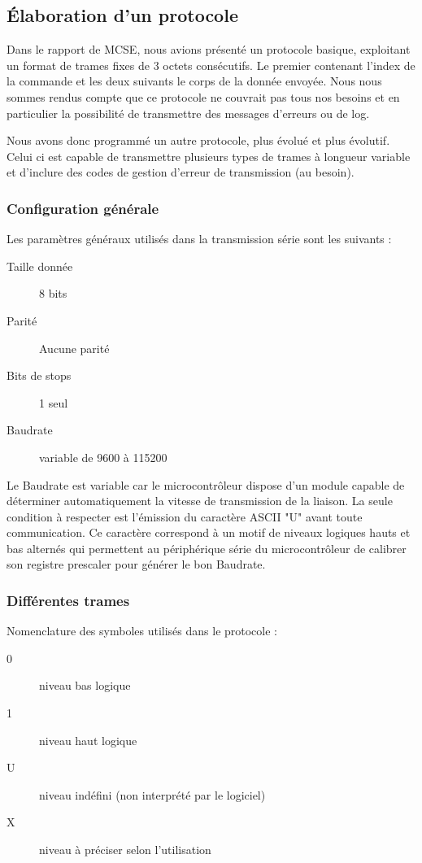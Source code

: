 \documentclass[11pt, french]{article} %
\begin{document}
\subsection{Élaboration d'un protocole}
Dans le rapport de MCSE, nous avions présenté un protocole basique, exploitant un format de trames fixes de 3 octets consécutifs. Le premier contenant l'index de la commande et les deux suivants le corps de la donnée envoyée. Nous nous sommes rendus compte que ce protocole ne couvrait pas tous nos besoins et en particulier la possibilité de transmettre des messages d'erreurs ou de log.

\medskip
Nous avons donc programmé un autre protocole, plus évolué et plus évolutif. Celui ci est capable de transmettre plusieurs types de trames à longueur variable et d'inclure des codes de gestion d'erreur de transmission (au besoin).

\subsubsection{Configuration générale}
\noindent
Les paramètres généraux utilisés dans la transmission série sont les suivants :
\begin{description}
	\item[Taille donnée] 8 bits
	\item[Parité] Aucune parité
	\item[Bits de stops] 1 seul
	\item[Baudrate] variable de 9600 à 115200
\end{description}

\medskip
Le Baudrate est variable car le microcontrôleur dispose d'un module capable de déterminer automatiquement la vitesse de transmission de la liaison. La seule condition à respecter est l'émission du caractère ASCII "U" avant toute communication. Ce caractère correspond à un motif de niveaux logiques hauts et bas alternés qui permettent au périphérique série du microcontrôleur de calibrer son registre prescaler pour générer le bon Baudrate.

\subsubsection{Différentes trames}
\noindent
Nomenclature des symboles utilisés dans le protocole :

\medskip
\begin{description}
	\item[0] niveau bas logique
	\item[1] niveau haut logique
	\item[U] niveau indéfini (non interprété par le logiciel)
	\item[X] niveau à préciser selon l'utilisation
\end{description}
\end{document}
